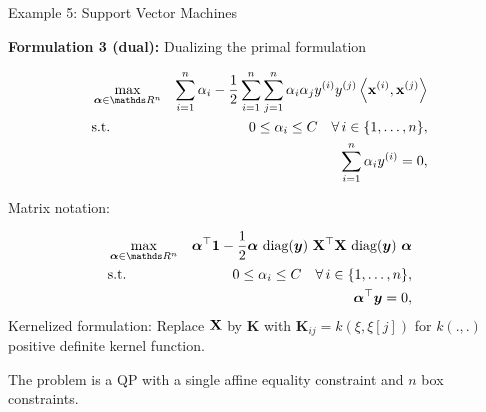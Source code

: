 \documentclass[11pt,compress,t,notes=noshow, xcolor=table]{beamer}
\newcommand{\alphav}{\bm{\alpha}} %
\begin{document}
%		
%		
%		


\begin{frame}{Example 5: Support Vector Machines}

\textbf{Formulation 3 (dual): } Dualizing the primal formulation 

\vspace*{-0.5cm}

\begin{footnotesize}
\begin{eqnarray*}
	& \max\limits_{\alphav \in \R^n} & \sum_{i=1}^n \alpha_i - \frac{1}{2}\sum_{i=1}^n\sum_{j=1}^n\alpha_i\alpha_j\yi y^{(j)} \scp{\xi}{\xv^{(j)}} \\
	& \text{s.t. } & 0 \le \alpha_i \le C \quad \forall\, i \in \nset, \\
	& \quad & \sum_{i=1}^n \alpha_i \yi = 0,
\end{eqnarray*}
\end{footnotesize}

\vspace*{-0.5cm}

Matrix notation: 

\vspace*{-0.5cm}

\begin{footnotesize}
\begin{eqnarray*}
	& \max\limits_{\alphav \in \R^n} & \bm{\alpha}^\top \bm{1} - \frac{1}{2} \bm{\alpha} ~ \text{diag}(\bm{y}) ~ \Xmat^\top \Xmat ~ \text{diag}(\bm{y})~\bm{\alpha} \\
	& \text{s.t. } & 0 \le \alpha_i \le C \quad \forall\, i \in \nset, \\
	& \quad & \bm{\alpha}^\top \bm{y} = 0,
\end{eqnarray*}
Kernelized formulation: Replace $\mathbf{X}$ by $\bm{K}$ with $\bm{K}_{ij} = k(\xi, \xi[j])$ for $k(.,.)$ positive definite kernel function. 
\end{footnotesize}

\vspace*{0.2cm}

The problem is a QP with a single affine equality constraint and $n$ box constraints. 

\end{frame}
\end{document}
